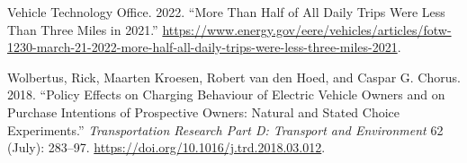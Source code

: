 \documentclass[
  letterpaper,
  DIV=11,
  numbers=noendperiod]{scrartcl}
\newlength{\cslhangindent}
\newlength{\cslentryspacingunit} %
\newenvironment{CSLReferences}[2] %
 {%
  \setlength{\parindent}{0pt}
  \ifodd #1
  \let\oldpar\par
  \def\par{\hangindent=\cslhangindent\oldpar}
  \fi
  \setlength{\parskip}{#2\cslentryspacingunit}
 }%
 {}
\begin{document}
\begin{CSLReferences}{1}{0}
\leavevmode{}%
Vehicle Technology Office. 2022. {``More Than Half of All Daily Trips
Were Less Than Three Miles in 2021.''}
\url{https://www.energy.gov/eere/vehicles/articles/fotw-1230-march-21-2022-more-half-all-daily-trips-were-less-three-miles-2021}.

\leavevmode{}%
Wolbertus, Rick, Maarten Kroesen, Robert van den Hoed, and Caspar G.
Chorus. 2018. {``Policy Effects on Charging Behaviour of Electric
Vehicle Owners and on Purchase Intentions of Prospective Owners: Natural
and Stated Choice Experiments.''} \emph{Transportation Research Part D:
Transport and Environment} 62 (July): 283--97.
\url{https://doi.org/10.1016/j.trd.2018.03.012}.

\end{CSLReferences}
\end{document}
